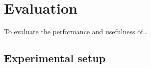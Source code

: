 \chapter{Evaluation}
\label{chap:evaluation}

To evaluate the performance and usefulness of\dots

\section{Experimental setup}
\label{sec:experimentalSetup}
\blindtext
